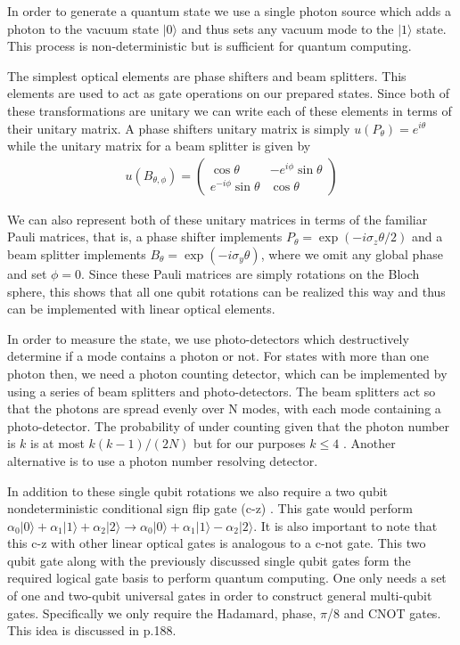 \documentclass[aps,pra,twocolumn,amsmath,amssymb,nofootinbib,superscriptaddress]{revtex4}
\newcommand{\ket}[1]{|#1\rangle}
\begin{document}
In order to generate a quantum state we use a single photon source which adds a photon to the vacuum state $\ket{0}$ and thus sets any vacuum mode to the $\ket{1}$ state. This process is non-deterministic but is sufficient for quantum computing.

The simplest optical elements are phase shifters and beam splitters. This elements are used to act as gate operations on our prepared states. Since both of these transformations are unitary we can write each of these elements in terms of their unitary matrix. A phase shifters unitary matrix is simply $u(P_\theta)= e^{i \theta}$ while the unitary matrix for a beam splitter is given by
\begin{eqnarray}
u(B_{\theta,\phi})=
\left(
\begin{array}{cc}
\cos{\theta}& -e^{i \phi} \sin{\theta} \\
e^{-i \phi} \sin{\theta}& \cos{\theta} 
\end{array}
\right)
\end{eqnarray}

We can also represent both of these unitary matrices in terms of the familiar Pauli matrices, that is, a phase shifter implements $P_\theta = \exp{(-i \sigma_z \theta/2)}$ and a beam splitter implements $B_\theta = \exp{(-i \sigma_y \theta)}$, where we omit any global phase and set $\phi=0$. Since these Pauli matrices are simply rotations on the Bloch sphere, this shows that all one qubit rotations can be realized this way and thus can be implemented with linear optical elements.

In order to measure the state, we use photo-detectors which destructively determine if a mode contains a photon or not. For states with more than one photon then, we need a photon counting detector, which can be implemented by using a series of beam splitters and photo-detectors. The beam splitters act so that the photons are spread evenly over N modes, with each mode containing a photo-detector. The probability of under counting given that the photon number is $k$ is at most $k(k-1)/(2N)$ but for our purposes $k \le 4 $ \cite{knill}. Another alternative is to use a photon number resolving detector.

In addition to these single qubit rotations we also require a two qubit nondeterministic conditional sign flip gate (c-z) \cite{knill}. This gate would perform $\alpha_0 \ket{0} + \alpha_1 \ket{1} +\alpha_2 \ket{2} \rightarrow \alpha_0 \ket{0} + \alpha_1 \ket{1} - \alpha_2 \ket{2}$. It is also important to note that this c-z with other linear optical gates is analogous to a c-not gate. This two qubit gate along with the previously discussed single qubit gates form the required logical gate basis to perform quantum computing. One only needs a set of one and two-qubit universal gates in order to construct general multi-qubit gates. Specifically we only require the Hadamard, phase, $\pi$/8 and CNOT gates. This idea is discussed in \cite{nielsen} p.188.
\end{document}

